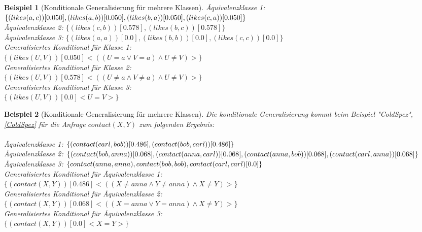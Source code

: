\documentclass[a4paper, 11pt]{book}
\newtheorem{Bsp}{Beispiel}[section]
\begin{document}
\begin{itemize}
\begin{itemize}
\begin{itemize}
\begin{Bsp}[Konditionale Generalisierung für mehrere Klassen]
				\noindent
			
				Äquivalenzklasse 1: $ \{(likes(a,c))[0.050], (likes(a,b))[0.050],\\ (likes(b,a))[0.050],\\ (likes(c,a))[0.050]\} $\\
				Äquivalenzklasse 2: $ \{(likes(c,b))[0.578], (likes(b,c))[0.578]\} $\\
				Äquivalenzklasse 3: $ \{(likes(a,a))[0.0], (likes(b,b))[0.0], (likes(c,c))[0.0]\} $\\
				
				\noindent
				Generalisiertes Konditional für Klasse 1: \\ $ \{(likes(U,V))[0.050] <((U = a \lor V = a)\land U \neq V)>\} $\\
				Generalisiertes Konditional für Klasse 2:\\ $ \{(likes(U,V))[0.578] <((U \neq a \land V \neq a) \land U \neq V)>\} $\\
				Generalisiertes Konditional für Klasse 3:\\ $ \{(likes(U,V))[0.0] <U = V>\} $\\
			\end{Bsp} 
			\begin{Bsp}[Konditionale Generalisierung für mehrere Klassen] Die konditionale Generalisierung kommt beim Beispiel "{}ColdSpez"{}, \ref{ColdSpez} für die Anfrage $ contact(X,Y) $ zum folgenden Ergebnis:\\
				\\
		
			Äquivalenzklasse 1: $ \{(contact(carl,bob))[0.486], \\ (contact(bob,carl))[0.486]\} $\\
			Äquivalenzklasse 2: $ \{(contact(bob,anna))[0.068], \\ (contact(anna, carl))[0.068],\\ (contact(anna, bob))[0.068],\\ (contact(carl, anna))[0.068]\} $ \\
			Äquivalenzklasse 3: $ \{ contact(anna,anna), contact(bob,bob), \\contact(carl,carl)[0.0]\} $\\
			
		
			\noindent
			Generalisiertes Konditional für Äquivalenzklasse 1:\\ $ \{(contact(X,Y))[0.486] <((X \neq anna \land Y \neq anna) \land X \neq Y)>\} $\\
			Generalisiertes Konditional für Äquivalenzklasse 2:\\ $ \{(contact(X,Y))[0.068] <((X = anna \lor Y = anna)\land X \neq Y)>\} $\\
			Generalisiertes Konditional für Äquivalenzklasse 3: \\$ \{(contact(X,Y))[0.0] <X = Y>\} $\\
		\end{Bsp} 


\end{itemize}
\end{itemize}
\end{itemize}
\end{document}
